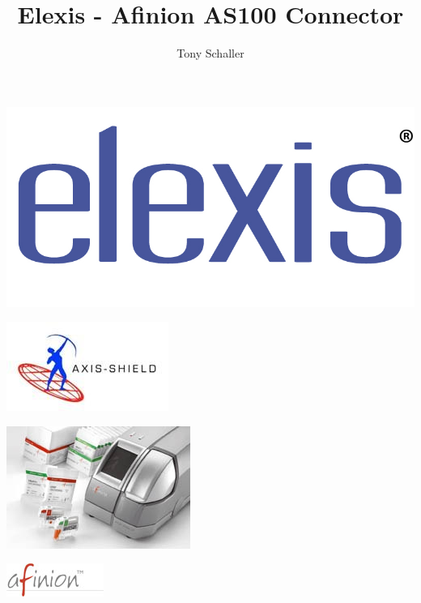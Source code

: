 \documentclass[a4paper]{scrartcl}
\title{Elexis - Afinion AS100 Connector}
\author{Tony Schaller}
\begin{document}
%
\maketitle
	\begin{center}
		\includegraphics{elexis_logo}
	\end{center}
	\begin{center}
		\includegraphics{axis-shield_logo}
	\end{center}
	\begin{center}
		\includegraphics{afinion_device}
	\end{center}
	\begin{center}
		\includegraphics{afinion_logo}
	\end{center}
\pagebreak
\end{document}
